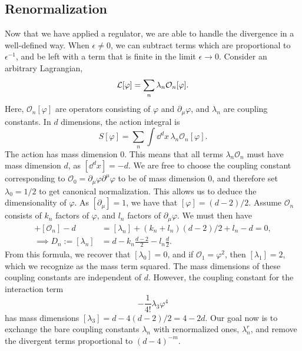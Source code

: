 \subsection{Renormalization}
\label{subsection: renormalization}

Now that we have applied a regulator, we are able to handle the divergence in a well-defined way.
When $\epsilon \neq 0$, we can subtract terms which are proportional to $\epsilon^{-1}$, and be left with a term that is finite in the limit $\epsilon \rightarrow 0$.
Consider an arbitrary Lagrangian, 
\begin{equation}
    \mathcal{L}[\varphi] = \sum_n \lambda_n \mathcal{O}_n[\varphi].
\end{equation}
Here, $\mathcal{O}_n[\varphi]$ are operators consisting of $\varphi$ and $\partial_\mu \varphi$, and $\lambda_n$ are coupling constants.
In $d$ dimensions, the action integral is
\begin{equation}
    S[\varphi] = \sum_n \int \dd^d x \, \lambda_n \mathcal{O}_n[\varphi].
\end{equation}
%
The action has mass dimension $0$.
This means that all terms $\lambda_n \mathcal O_n$ must have mass dimension $d$, as $[\dd^d x] = -d$.
We are free to choose the coupling constant corresponding to $\mathcal O_0 = \partial_\mu \varphi \partial^\mu \varphi$ to be of mass dimension 0, and therefore set $\lambda_0 = 1/2$ to get canonical normalization.
This allows us to deduce the dimensionality of $\varphi$.
As $[\partial_\mu] = 1$, we have that $[\varphi] = (d-2)/2$.
Assume $\mathcal O_n$ consists of $k_n$ factors of $\varphi$, and $l_n$ factors of $\partial_\mu \varphi$.
We must then have
\begin{align}
    [\lambda_n] + [\mathcal{O}_n] - d &= [\lambda_n] + (k_n + l_n)(d - 2) / 2 + l_n - d = 0, \\
    \implies D_n := [\lambda_n] &= d - k_n \frac{d - 2}{2} - l_n \frac{d}{2}.
\end{align}
%
From this formula, we recover that $[\lambda_0] = 0$, and if $\mathcal O_1 = \varphi^2$, then $[\lambda_1] = 2$, which we recognize as the mass term squared.
The mass dimensions of these coupling constants are independent of $d$.
However, the coupling constant for the interaction term
\begin{equation}
    - \frac{1}{4!} \lambda_3 \varphi^4
\end{equation}
has mass dimensions $[\lambda_3] = d -4(d-2)/2 = 4 - 2d$.
Our goal now is to exchange the bare coupling constants $\lambda_n$ with renormalized ones, $\lambda_n^r$, and remove the divergent terms proportional to $(d - 4)^{-m}$.
